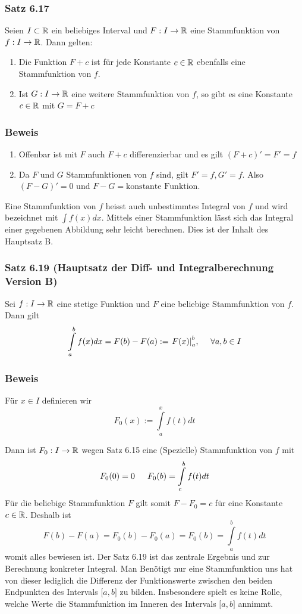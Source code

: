 \subsubsection*{Satz 6.17}
Seien $I\subset \mathbb{R}$ ein beliebiges Interval und $F:I\to\mathbb{R}$ eine Stammfunktion von $f:I\to\mathbb{R}$. Dann gelten:
\begin{enumerate}[\indent (a)]
\item Die Funktion $F+c$ ist für jede Konstante $c\in\mathbb{R}$ ebenfalls eine Stammfunktion von $f$.
\item Ist $G:I\to\mathbb{R}$ eine weitere Stammfunktion von $f$, so gibt es eine Konstante $c\in\mathbb{R}$ mit $G=F+c$
\end{enumerate}

\subsubsection*{Beweis}
\begin{enumerate}[\indent (a)]
\item Offenbar ist mit $F$ auch $F+c$ differenzierbar und es gilt $(F+c)'=F'=f$
\item Da $F$ und $G$ Stammfunktionen von $f$ sind, gilt $F'=f, G'=f$. Also $(F-G)'=0$ und $F-G=\text{konstante Funktion}$. 
\end{enumerate}

\begin{definition}{6.18}
 Eine Stammfunktion von $f$ heisst auch unbestimmtes Integral von $f$ und wird bezeichnet mit $\int {f(x)dx} $. Mittels einer Stammfunktion lässt sich das Integral einer gegebenen Abbildung sehr leicht berechnen. Dies ist der Inhalt des Hauptsatz B.\\
\end{definition}
\subsubsection*{Satz 6.19 (Hauptsatz der Diff- und Integralberechnung Version B)}
Sei $f:I\to\mathbb{R}$ eine stetige Funktion und $F$ eine beliebige Stammfunktion von $f$. Dann gilt \[\int\limits_a^b {f(x)dx = F(b) - F(a): = \left. {F(x)} \right|_a^b}\text{,\indent}\forall a,b\in I \]

\subsubsection*{Beweis}
Für $x\in I$ definieren wir \[F_0(x):=\int\limits_a^x {f(t)dt} \]

Dann ist $F_0:I\to\mathbb{R}$ wegen Satz 6.15 eine (Spezielle) Stammfunktion von $f$ mit \[{F_0}(0) = 0\text{\indent}{F_0}(b) = \int\limits_c^b {f(t)dt} \]
Für die beliebige Stammfunktion $F$ gilt somit $F-F_0=c$ für eine Konstante $c\in\mathbb{R}$. Deshalb ist \[F(b) - F(a) = {F_0}(b) - {F_0}(a) = {F_0}(b) = \int\limits_a^b {f(t)dt} \] womit alles bewiesen ist. Der Satz 6.19 ist das zentrale Ergebnis und zur Berechnung konkreter Integral. Man Benötigt nur eine Stammfunktion uns hat von dieser lediglich die Differenz der Funktionswerte zwischen den beiden Endpunkten des Intervals $\lbrack a,b\rbrack$ zu bilden. 
Insbesondere spielt es keine Rolle, welche Werte die Stammfunktion im Inneren des Intervals  $\lbrack a,b\rbrack$ annimmt.
